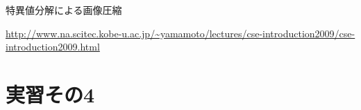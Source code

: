 \documentclass[dvipdfmx]{beamer}
\begin{document}
\begin{frame}[t,fragile]{特異値分解による画像圧縮}
  \noindent%

  \hfill{\fontsize{5.5pt}{0pt}\selectfont \url{http://www.na.scitec.kobe-u.ac.jp/~yamamoto/lectures/cse-introduction2009/cse-introduction2009.html}}
\end{frame}

\section{実習その4}
\end{document}
